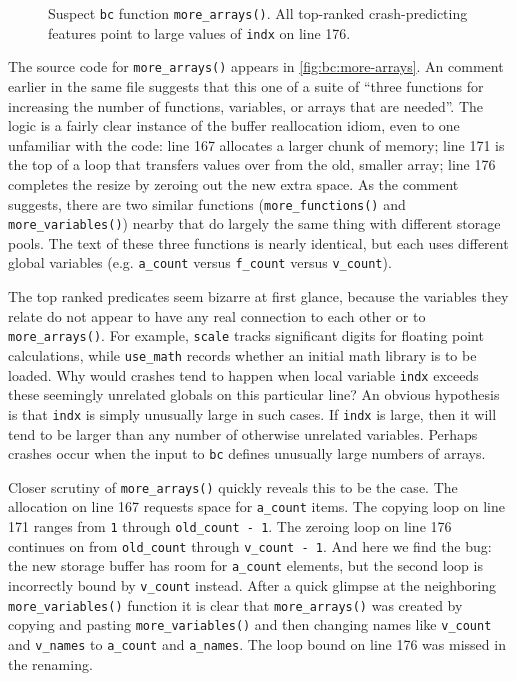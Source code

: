 \begin{figure}
  \centering
  \small
  \caption{Suspect \texttt{bc} function \texttt{more\_arrays()}.  All
  top-ranked crash-predicting features point to large values of
  \texttt{indx} on line 176.}
  \label{fig:bc:more-arrays}
\end{figure}

The source code for \texttt{more\_arrays()} appears in
\autoref{fig:bc:more-arrays}.  An comment earlier in the same file
suggests that this one of a suite of ``three functions for increasing
the number of functions, variables, or arrays that are needed''.  The
logic is a fairly clear instance of the buffer reallocation idiom,
even to one unfamiliar with the code: line 167 allocates a larger
chunk of memory; line 171 is the top of a loop that transfers values
over from the old, smaller array; line 176 completes the resize by
zeroing out the new extra space.  As the comment suggests, there are
two similar functions (\texttt{more\_functions()} and
\texttt{more\_variables()}) nearby that do largely the same thing with
different storage pools.  The text of these three functions is nearly
identical, but each uses different global variables (e.g.
\texttt{a\_count} versus \texttt{f\_count} versus \texttt{v\_count}).

The top ranked predicates seem bizarre at first glance, because the
variables they relate do not appear to have any real connection to
each other or to \texttt{more\_arrays()}.  For example, \texttt{scale}
tracks significant digits for floating point calculations, while
\texttt{use\_math} records whether an initial math library is to be
loaded.  Why would crashes tend to happen when local variable
\texttt{indx} exceeds these seemingly unrelated globals on this
particular line?  An obvious hypothesis is that \texttt{indx} is
simply unusually large in such cases.  If \texttt{indx} is large, then
it will tend to be larger than any number of otherwise unrelated
variables.  Perhaps crashes occur when the input to \texttt{bc}
defines unusually large numbers of arrays.

Closer scrutiny of \texttt{more\_arrays()} quickly reveals this to be
the case.  The allocation on line 167 requests space for
\texttt{a\_count} items.  The copying loop on line 171 ranges from
\texttt{1} through \texttt{old\_count - 1}.  The zeroing loop on line
176 continues on from \texttt{old\_count} through \texttt{v\_count -
  1}.  And here we find the bug: the new storage buffer has room for
\texttt{a\_count} elements, but the second loop is incorrectly bound
by \texttt{v\_count} instead.  After a quick glimpse at the
neighboring \texttt{more\_variables()} function it is clear that
\texttt{more\_arrays()} was created by copying and pasting
\texttt{more\_variables()} and then changing names like
\texttt{v\_count} and \texttt{v\_names} to \texttt{a\_count} and
\texttt{a\_names}.  The loop bound on line 176 was missed in the
renaming.

